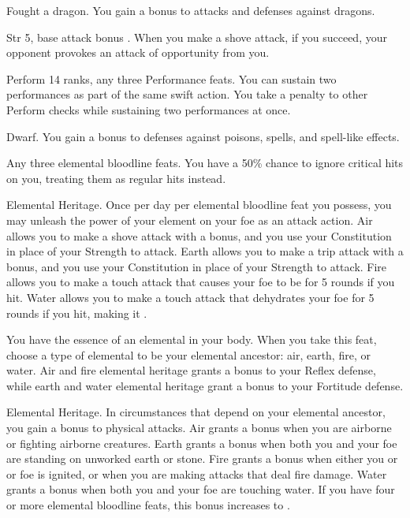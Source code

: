 \featpre Fought a dragon.
\featben You gain a  bonus to attacks and defenses against dragons.
\featspecial \featbanenotes

\featpre Str 5, base attack bonus .
\featben When you make a shove attack, if you succeed, your opponent provokes an attack of opportunity from you.

\featpres Perform 14 ranks, any three Performance feats.
\featben You can sustain two performances as part of the same swift action. You take a  penalty to other Perform checks while sustaining two performances at once.

 Dwarf.
 You gain a  bonus to defenses against poisons, spells, and spell-like effects.

\featpre Any three elemental bloodline feats.
\featben You have a 50\% chance to ignore critical hits on you, treating them as regular hits instead.

\featpre Elemental Heritage.
\featben Once per day per elemental bloodline feat you possess, you may unleash the power of your element on your foe as an attack action. Air allows you to make a shove attack with a  bonus, and you use your Constitution in place of your Strength to attack. Earth allows you to make a trip attack with a  bonus, and you use your Constitution in place of your Strength to attack. Fire allows you to make a touch attack that causes your foe to be \ignited for 5 rounds if you hit. Water allows you to make a touch attack that dehydrates your foe for 5 rounds if you hit, making it \vulnerable.

\featben You have the essence of an elemental in your body. When you take this feat, choose a type of elemental to be your elemental ancestor: air, earth, fire, or water. Air and fire elemental heritage grants a  bonus to your Reflex defense, while earth and water elemental heritage grant a  bonus to your Fortitude defense.

\featpre Elemental Heritage.
\featben In circumstances that depend on your elemental ancestor, you gain a  bonus to physical attacks. Air grants a bonus when you are airborne or fighting airborne creatures. Earth grants a bonus when both you and your foe are standing on unworked earth or stone. Fire grants a bonus when either you or or foe is ignited, or when you are making attacks that deal fire damage. Water grants a bonus when both you and your foe are touching water. If you have four or more elemental bloodline feats, this bonus increases to .

